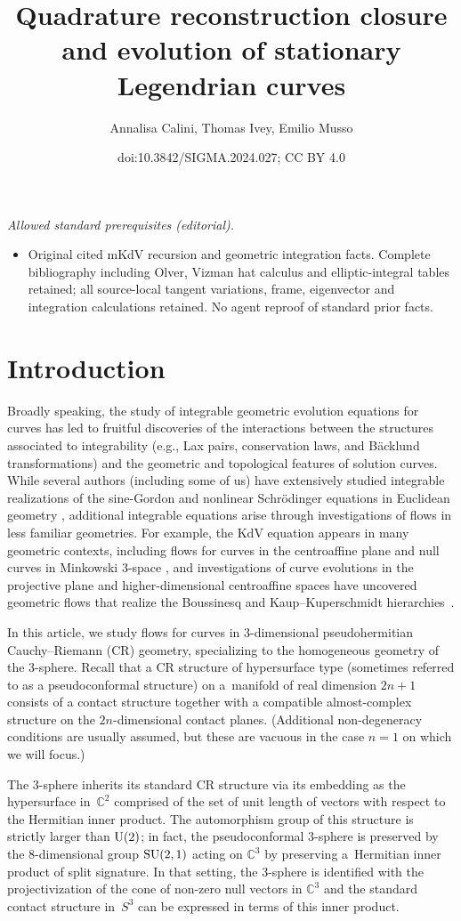 \documentclass[10pt,a4paper]{amsart}
\title{Quadrature reconstruction closure and evolution of stationary Legendrian curves}
\author{Annalisa Calini, Thomas Ivey, Emilio Musso}
\date{doi:10.3842/SIGMA.2024.027; CC BY 4.0}
\def\C{\mathbb C}
\numberwithin{equation}{section}
\begin{document}
\maketitle
\noindent\textit{Allowed standard prerequisites (editorial).}\begin{itemize}
\item Original cited mKdV recursion and geometric integration facts. Complete bibliography including Olver, Vizman hat calculus and elliptic-integral tables retained; all source-local tangent variations, frame, eigenvector and integration calculations retained. No agent reproof of standard prior facts.
\end{itemize}\medskip
\section{Introduction}
Broadly speaking, the study of integrable geometric evolution equations for curves has led to fruitful discoveries of the interactions between the structures associated to integrability (e.g., Lax pairs, conservation laws, and B\"acklund transformations) and the geometric and topological features of solution curves. While several authors (including some of us) have extensively studied integrable realizations of the sine-Gordon and nonlinear Schr\"odinger equations in Euclidean geometry \cite{CI99,CI01,LP91}, additional integrable equations arise through investigations of flows in less familiar geometries. For example, the KdV equation appears in many geometric contexts, including flows for curves in the centroaffine plane \cite{CIM1,Pi} and null curves in Minkowski 3-space \cite{MN}, and investigations of curve evolutions in the projective plane and higher-dimensional centroaffine spaces have uncovered geometric flows that realize the Boussinesq and Kaup--Kuperschmidt hierarchies~\cite{CIM2,M1}.

In this article, we study flows for curves in 3-dimensional pseudohermitian Cauchy--Riemann (CR) geometry, specializing to the homogeneous geometry of the 3-sphere. Recall that a CR structure of hypersurface type (sometimes referred to as a pseudoconformal structure) on a~mani\-fold of real dimension $2n+1$ consists of a contact structure together with a compatible almost-complex structure on the $2n$-dimensional contact planes.
(Additional non-degeneracy conditions are usually assumed, but these are vacuous
in the case $n=1$ on which we will focus.)

The 3-sphere inherits its standard CR structure via its embedding as the hypersurface in~$\C^2$ comprised of the set of unit length
of vectors with respect to the Hermitian inner product. The automorphism group of this structure is strictly larger than ${\rm U}(2)$; in fact, the pseudoconformal 3-sphere is preserved by the 8-dimensional group ${\rm SU}(2,1)$ acting on $\C^3$ by preserving a~Hermitian inner product of split signature. In that setting, the 3-sphere is identified with the projectivization of the cone of non-zero null vectors in $\C^3$ and the standard contact structure in~$S^3$ can be expressed in terms of this inner product.
\end{document}
